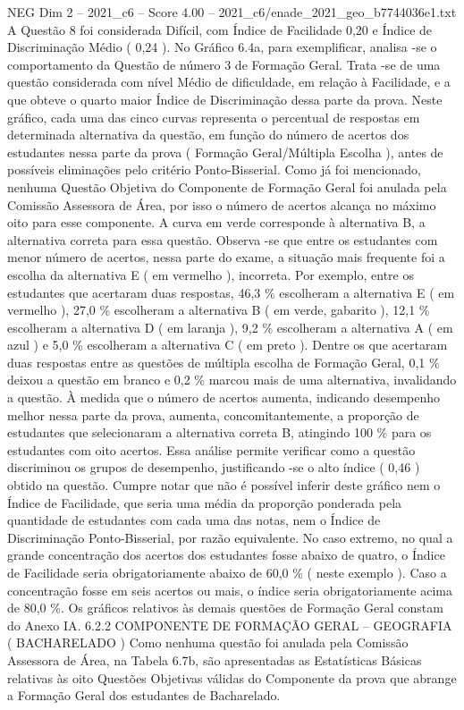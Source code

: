 \begin{textsample}{NEG Dim 2 – 2021\_c6 – Score 4.00 – 2021\_c6/enade\_2021\_geo\_b7744036e1.txt}
A Questão 8 foi considerada Difícil, com Índice de Facilidade 0,20 e Índice de Discriminação Médio ( 0,24 ).
No Gráfico 6.4a, para exemplificar, analisa -se o comportamento da Questão de número 3 de Formação Geral.
Trata -se de uma questão considerada com nível Médio de dificuldade, em relação à Facilidade, e a que obteve o quarto maior Índice de Discriminação dessa parte da prova.
Neste gráfico, cada uma das cinco curvas representa o percentual de respostas em determinada alternativa da questão, em função do número de acertos dos estudantes nessa parte da prova ( Formação Geral/Múltipla Escolha ), antes de possíveis eliminações pelo critério Ponto-Bisserial.
Como já foi mencionado, nenhuma Questão Objetiva do Componente de Formação Geral foi anulada pela Comissão Assessora de Área, por isso o número de acertos alcança no máximo oito para esse componente.
A curva em verde corresponde à alternativa B, a alternativa correta para essa questão.
Observa -se que entre os estudantes com menor número de acertos, nessa parte do exame, a situação mais frequente foi a escolha da alternativa E ( em vermelho ), incorreta.
Por exemplo, entre os estudantes que acertaram duas respostas, 46,3 \% escolheram a alternativa E ( em vermelho ), 27,0 \% escolheram a alternativa B ( em verde, gabarito ), 12,1 \% escolheram a alternativa D ( em laranja ), 9,2 \% escolheram a alternativa A ( em azul ) e 5,0 \% escolheram a alternativa C ( em preto ).
Dentre os que acertaram duas respostas entre as questões de múltipla escolha de Formação Geral, 0,1 \% deixou a questão em branco e 0,2 \% marcou mais de uma alternativa, invalidando a questão.
À medida que o número de acertos aumenta, indicando desempenho melhor nessa parte da prova, aumenta, concomitantemente, a proporção de estudantes que selecionaram a alternativa correta B, atingindo 100 \% para os estudantes com oito acertos.
Essa análise permite verificar como a questão discriminou os grupos de desempenho, justificando -se o alto índice ( 0,46 ) obtido na questão.
Cumpre notar que não é possível inferir deste gráfico nem o Índice de Facilidade, que seria uma média da proporção ponderada pela quantidade de estudantes com cada uma das notas, nem o Índice de Discriminação Ponto-Bisserial, por razão equivalente.
No caso extremo, no qual a grande concentração dos acertos dos estudantes fosse abaixo de quatro, o Índice de Facilidade seria obrigatoriamente abaixo de 60,0 \% ( neste exemplo ).
Caso a concentração fosse em seis acertos ou mais, o índice seria obrigatoriamente acima de 80,0 \%.
Os gráficos relativos às demais questões de Formação Geral constam do Anexo IA. 6.2.2 COMPONENTE DE FORMAÇÃO GERAL – GEOGRAFIA ( BACHARELADO ) Como nenhuma questão foi anulada pela Comissão Assessora de Área, na Tabela 6.7b, são apresentadas as Estatísticas Básicas relativas às oito Questões Objetivas válidas do Componente da prova que abrange a Formação Geral dos estudantes de Bacharelado.

\end{textsample}
